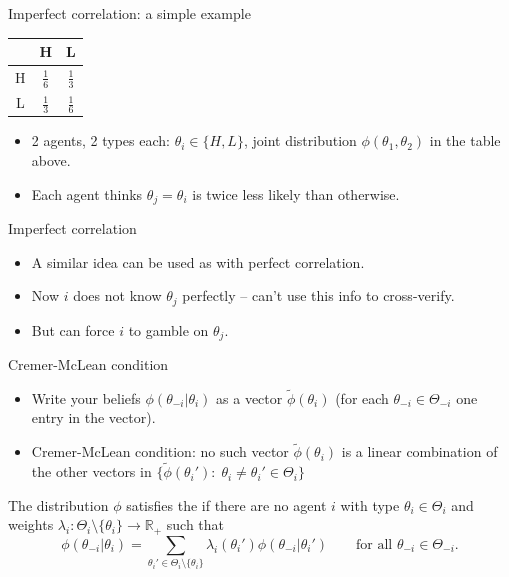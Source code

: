 \documentclass[english,10pt
,aspectratio=169
]{beamer}
\begin{document}
\begin{frame}{Imperfect correlation: a simple example}
\begin{example}[2x2]
	\begin{center}
		\begin{tabular}{c | c | c |}
			 & H 				& L					\\ \hline
			H	& $\frac{1}{6}$ 	& $\frac{1}{3}$ 	\\ \hline
			L	& $\frac{1}{3}$ 	& $\frac{1}{6}$		\\ \hline
		\end{tabular}
	\end{center}
	\begin{itemize}
		\item 2 agents, 2 types each: $\theta_i \in \{H,L\}$, joint distribution $\phi(\theta_1,\theta_2)$ in the table above.
		\item Each agent thinks $\theta_j = \theta_i$ is twice less likely than otherwise. 
	\end{itemize}
\end{example}
\end{frame}


\begin{frame}{Imperfect correlation}
\begin{itemize}
	\item A similar idea can be used as with perfect correlation.
	\item Now $i$ does not know $\theta_j$ perfectly -- can't use this info to cross-verify.
	\item But can force $i$ to gamble on $\theta_j$.
\end{itemize}
\end{frame}


\begin{frame}{Cremer-McLean condition}
\begin{itemize}
	\item Write your beliefs $\phi(\theta_{-i}|\theta_i)$ as a vector $\tilde\phi(\theta_i)$ (for each $\theta_{-i}\in\Theta_{-i}$ one entry in the vector).
	\item Cremer-McLean condition: no such vector $\tilde\phi(\theta_i)$ is a linear combination of the other vectors in $\{\tilde\phi(\theta_i'):\;\theta_i\neq\theta_i'\in\Theta_i\}$
\end{itemize}

\begin{definition}[CM condition]
	The distribution $\phi$ satisfies the  if there are no agent $i$ with type $\theta_i\in\Theta_i$ and weights $\lambda_i: \Theta_i\setminus\{\theta_i\} \to \mathbb{R}_+$ such that
	\begin{equation*}
		\phi(\theta _{-i}|\theta _i)=\sum_{\theta _i'\in\Theta_i\setminus\{\theta_i\}}\lambda_i(\theta_i')\phi(\theta_{-i}|\theta_i')\qquad\text{for all }\theta_{-i}\in\Theta_{-i}.
	\end{equation*}
\end{definition}
\end{frame}
\end{document}
